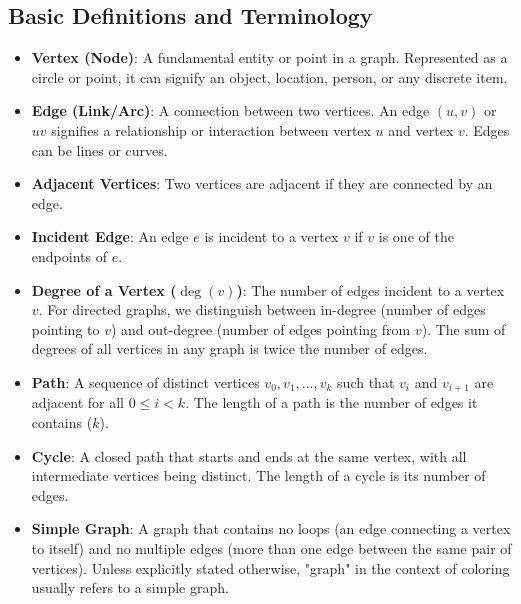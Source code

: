 \documentclass[11pt, a4paper]{article}
\begin{document}
\subsection{Basic Definitions and Terminology}
\begin{itemize}[noitemsep,topsep=3pt,parsep=3pt,partopsep=0pt]
    \item \textbf{Vertex (Node)}: A fundamental entity or point in a graph. Represented as a circle or point, it can signify an object, location, person, or any discrete item.
    \item \textbf{Edge (Link/Arc)}: A connection between two vertices. An edge $(u,v)$ or $uv$ signifies a relationship or interaction between vertex $u$ and vertex $v$. Edges can be lines or curves.
    \item \textbf{Adjacent Vertices}: Two vertices are adjacent if they are connected by an edge.
    \item \textbf{Incident Edge}: An edge $e$ is incident to a vertex $v$ if $v$ is one of the endpoints of $e$.
    \item \textbf{Degree of a Vertex ($\deg(v)$)}: The number of edges incident to a vertex $v$. For directed graphs, we distinguish between in-degree (number of edges pointing to $v$) and out-degree (number of edges pointing from $v$). The sum of degrees of all vertices in any graph is twice the number of edges.
    \item \textbf{Path}: A sequence of distinct vertices $v_0, v_1, \ldots, v_k$ such that $v_i$ and $v_{i+1}$ are adjacent for all $0 \le i < k$. The length of a path is the number of edges it contains ($k$).
    \item \textbf{Cycle}: A closed path that starts and ends at the same vertex, with all intermediate vertices being distinct. The length of a cycle is its number of edges.
    \item \textbf{Simple Graph}: A graph that contains no loops (an edge connecting a vertex to itself) and no multiple edges (more than one edge between the same pair of vertices). Unless explicitly stated otherwise, "graph" in the context of coloring usually refers to a simple graph.
\end{itemize}
\end{document}
